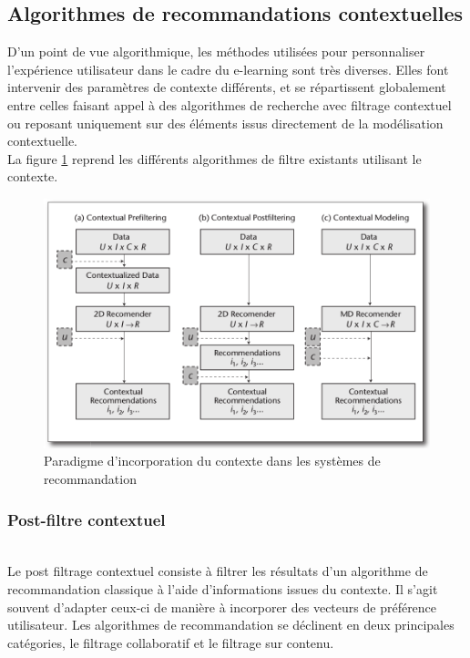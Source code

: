 \documentclass[conference]{./sty/IEEEtran}
\begin{document}
\subsection{Algorithmes de recommandations contextuelles}

D'un point de vue algorithmique, les méthodes utilisées pour personnaliser
l'expérience utilisateur dans le cadre du e-learning sont très diverses. Elles
font intervenir des paramètres de contexte différents, et se répartissent
globalement entre celles faisant appel à des algorithmes de recherche avec
filtrage contextuel ou reposant uniquement sur des éléments issus directement
de la modélisation contextuelle. \\

La figure \ref{fig:algos} reprend les différents algorithmes de filtre
existants utilisant le contexte. \\

\begin{figure}[tb]
  \centering
  \caption{\label{fig:algos} Paradigme d'incorporation du contexte dans les systèmes de recommandation \cite{DBLP:journals/aim/AdomaviciusMRT11}}
  \includegraphics[width=\textwidth]{algo}
\end{figure}


\subsubsection{Post-filtre contextuel}
~\\
Le post filtrage contextuel consiste à filtrer les résultats d'un algorithme
de recommandation classique à l'aide d'informations issues du
contexte\cite{DBLP:journals/tlt/VerbertMOWDBD12}. Il s'agit souvent d'adapter
ceux-ci de manière à incorporer des vecteurs de préférence utilisateur. Les
algorithmes de recommandation se déclinent en deux principales catégories, le
filtrage collaboratif et le filtrage sur contenu. \\
\end{document}
